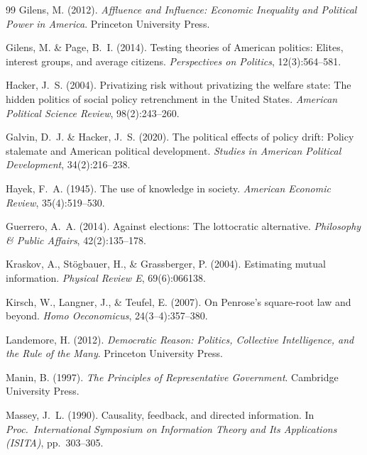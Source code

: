 \documentclass[twocolumn,10pt]{article}
\begin{document}
\begin{thebibliography}{99}
Gilens, M. (2012).
\newblock \emph{Affluence and Influence: Economic Inequality and Political Power in America}.
\newblock Princeton University Press.

Gilens, M. \& Page, B.~I. (2014).
\newblock Testing theories of {A}merican politics: Elites, interest groups, and average citizens.
\newblock \emph{Perspectives on Politics}, 12(3):564--581.

Hacker, J.~S. (2004).
\newblock Privatizing risk without privatizing the welfare state: The hidden politics of social policy retrenchment in the {U}nited {S}tates.
\newblock \emph{American Political Science Review}, 98(2):243--260.

Galvin, D.~J. \& Hacker, J.~S. (2020).
\newblock The political effects of policy drift: Policy stalemate and {A}merican political development.
\newblock \emph{Studies in American Political Development}, 34(2):216--238.

Hayek, F.~A. (1945).
\newblock The use of knowledge in society.
\newblock \emph{American Economic Review}, 35(4):519--530.

Guerrero, A.~A. (2014).
\newblock Against elections: The lottocratic alternative.
\newblock \emph{Philosophy \& Public Affairs}, 42(2):135--178.

Kraskov, A., St\"{o}gbauer, H., \& Grassberger, P. (2004).
\newblock Estimating mutual information.
\newblock \emph{Physical Review E}, 69(6):066138.

Kirsch, W., Langner, J., \& Teufel, E. (2007).
\newblock On {P}enrose's square-root law and beyond.
\newblock \emph{Homo Oeconomicus}, 24(3--4):357--380.

Landemore, H. (2012).
\newblock \emph{Democratic Reason: Politics, Collective Intelligence, and the Rule of the Many}.
\newblock Princeton University Press.

Manin, B. (1997).
\newblock \emph{The Principles of Representative Government}.
\newblock Cambridge University Press.

Massey, J.~L. (1990).
\newblock Causality, feedback, and directed information.
\newblock In \emph{Proc.\ International Symposium on Information Theory and Its Applications (ISITA)}, pp.~303--305.


\end{thebibliography}
\end{document}
